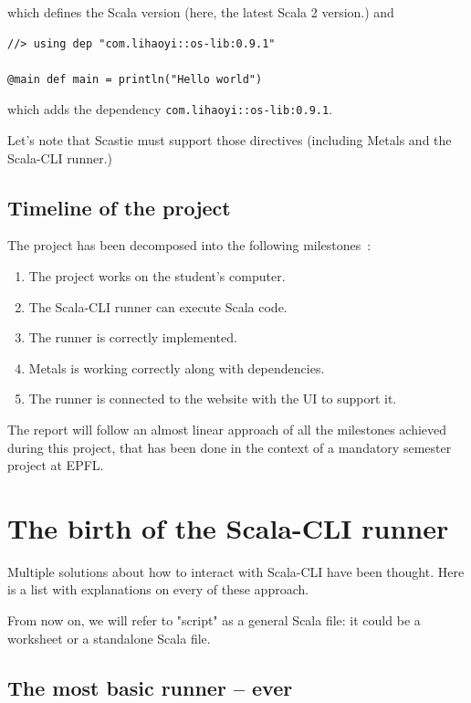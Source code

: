 \documentclass{article}
\begin{document}
which defines the Scala version (here, the latest Scala 2 version.) and

\begin{lstlisting}[style=sc]
//> using dep "com.lihaoyi::os-lib:0.9.1"

@main def main = println("Hello world")
\end{lstlisting}

which adds the dependency \lstinline{com.lihaoyi::os-lib:0.9.1}.

Let's note that Scastie must support those directives (including Metals and the Scala-CLI runner.)

\subsection{Timeline of the project}

The project has been decomposed into the following milestones~:

\begin{enumerate}
    \item The project works on the student's computer.
    \item The Scala-CLI runner can execute Scala code.
    \item The runner is correctly implemented.
    \item Metals is working correctly along with dependencies.
    \item The runner is connected to the website with the UI to support it.
\end{enumerate}

The report will follow an almost linear approach of all the milestones achieved during this project,
that has been done in the context of a mandatory semester project at EPFL.

\section{The birth of the Scala-CLI runner}

Multiple solutions about how to interact with Scala-CLI have been thought. Here is a list with explanations on every of these approach.

From now on, we will refer to "script" as a general Scala file: it could be a worksheet or a standalone Scala file.

\subsection{The most basic runner -- ever}
\end{document}
